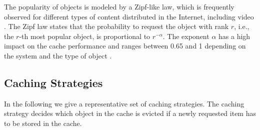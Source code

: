 The popularity of objects is modeled by a Zipf-like law, which is frequently observed for different types of content distributed in the Internet, including video \cite{gill2007youtube,cha2009analyzing}.
The Zipf law states that the probability to request the object with rank $r$, i.e., the $r$-th most popular object, is proportional to $r^{-\alpha}$.
The exponent $\alpha$ has a high impact on the cache performance and ranges between 0.65 and 1 depending on the system and the type of object \cite{fricker2012impact, zink2009characteristics}.

\subsection{Caching Strategies}\label{sec:hierarchical:background:strategies}

In the following we give a representative set of caching strategies.
The caching strategy decides which object in the cache is evicted if a newly requested item has to be stored in the cache.


